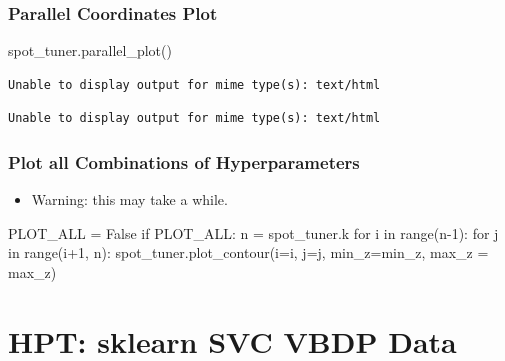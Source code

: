 \documentclass[
  letterpaper,
  DIV=11,
  numbers=noendperiod]{scrreprt}
\newenvironment{Shaded}{\begin{snugshade}}{\end{snugshade}}
\newcommand{\BuiltInTok}[1]{\textcolor[rgb]{0.00,0.23,0.31}{#1}}
\newcommand{\ControlFlowTok}[1]{\textcolor[rgb]{0.00,0.23,0.31}{#1}}
\newcommand{\DecValTok}[1]{\textcolor[rgb]{0.68,0.00,0.00}{#1}}
\newcommand{\KeywordTok}[1]{\textcolor[rgb]{0.00,0.23,0.31}{#1}}
\newcommand{\NormalTok}[1]{\textcolor[rgb]{0.00,0.23,0.31}{#1}}
\newcommand{\OperatorTok}[1]{\textcolor[rgb]{0.37,0.37,0.37}{#1}}
\newcommand{\VariableTok}[1]{\textcolor[rgb]{0.07,0.07,0.07}{#1}}
\providecommand{\tightlist}{%
  \setlength{\itemsep}{0pt}\setlength{\parskip}{0pt}}\usepackage{longtable,booktabs,array}
\begin{document}
\hypertarget{parallel-coordinates-plot-2}{%
\subsection{Parallel Coordinates
Plot}\label{parallel-coordinates-plot-2}}

\begin{Shaded}
\begin{Highlighting}[]
\NormalTok{spot\_tuner.parallel\_plot()}
\end{Highlighting}
\end{Shaded}

\begin{verbatim}
Unable to display output for mime type(s): text/html
\end{verbatim}

\begin{verbatim}
Unable to display output for mime type(s): text/html
\end{verbatim}

\hypertarget{plot-all-combinations-of-hyperparameters-3}{%
\subsection{Plot all Combinations of
Hyperparameters}\label{plot-all-combinations-of-hyperparameters-3}}

\begin{itemize}
\tightlist
\item
  Warning: this may take a while.
\end{itemize}

\begin{Shaded}
\begin{Highlighting}[]
\NormalTok{PLOT\_ALL }\OperatorTok{=} \VariableTok{False}
\ControlFlowTok{if}\NormalTok{ PLOT\_ALL:}
\NormalTok{    n }\OperatorTok{=}\NormalTok{ spot\_tuner.k}
    \ControlFlowTok{for}\NormalTok{ i }\KeywordTok{in} \BuiltInTok{range}\NormalTok{(n}\OperatorTok{{-}}\DecValTok{1}\NormalTok{):}
        \ControlFlowTok{for}\NormalTok{ j }\KeywordTok{in} \BuiltInTok{range}\NormalTok{(i}\OperatorTok{+}\DecValTok{1}\NormalTok{, n):}
\NormalTok{            spot\_tuner.plot\_contour(i}\OperatorTok{=}\NormalTok{i, j}\OperatorTok{=}\NormalTok{j, min\_z}\OperatorTok{=}\NormalTok{min\_z, max\_z }\OperatorTok{=}\NormalTok{ max\_z)}
\end{Highlighting}
\end{Shaded}

\hypertarget{sec-hpt-sklearn-svc-vbdp-data}{%
\chapter{HPT: sklearn SVC VBDP
Data}\label{sec-hpt-sklearn-svc-vbdp-data}}
\end{document}
